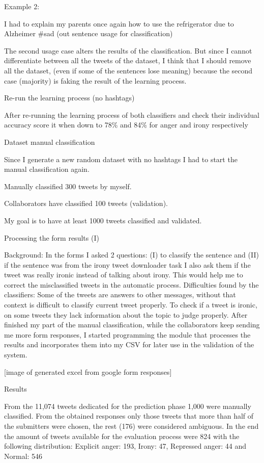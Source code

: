 Example 2:

I had to explain my parents once again how to use the refrigerator due to Alzheimer \#sad 
(out sentence usage for classification)

The second usage case alters the results of the classification. But since I cannot differentiate between all the tweets of the dataset, I think that I should remove all the dataset, (even if some of the sentences lose meaning) because the second case (majority) is faking the result of the learning process. 

Re-run the learning process (no hashtags)

After re-running the learning process of both classifiers and check their individual accuracy score it when down to 78\% and 84\% for anger and irony respectively

Dataset manual classification

Since I generate a new random dataset with no hashtags I had to start the manual classification again.

Manually classified 300 tweets by myself. 

Collaborators have classified 100 tweets (validation).

My goal is to have at least 1000 tweets classified and validated.

Processing the form results (I)

Background: In the forms I asked 2 questions: (I) to classify the sentence and (II) if the sentence was from the irony tweet downloader task I also ask them if the tweet was really ironic instead of talking about irony. This would help me to correct the misclassified tweets in the automatic process.
Difficulties found by the classifiers:  
Some of the tweets are answers to other messages, without that context is difficult to classify current tweet properly.
To check if a tweet is ironic, on some tweets they lack information about the topic to judge properly.
After finished my part of the manual classification, while the collaborators keep sending me more form responses, I started programming the module that processes the results and incorporates them into my CSV for later use in the validation of the system.

[image of generated excel from google form responses]

Results

From the 11,074 tweets dedicated for the prediction phase 1,000 were manually classified. From the obtained responses only those tweets that more than half of the submitters were chosen, the rest (176) were considered ambiguous.
In the end the amount of tweets available for the evaluation process were 824 with the following distribution:
Explicit anger: 193, Irony: 47, Repressed anger: 44 and Normal: 546

